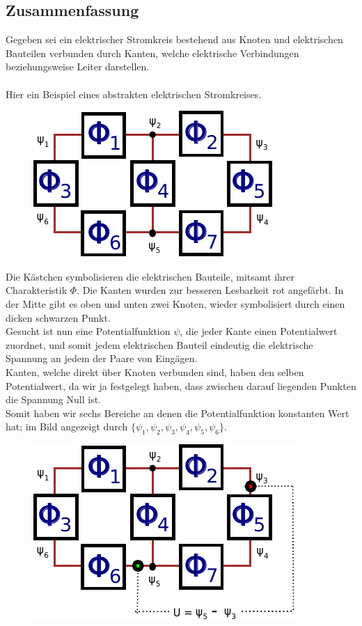 \documentclass[11pt,a4paper,leqno]{report}
\numberwithin{equation}{chapter}
\begin{document}
\subsection{Zusammenfassung}
Gegeben sei ein elektrischer Stromkreis bestehend aus Knoten und elektrischen Bauteilen verbunden durch Kanten, welche elektrische Verbindungen beziehungsweise Leiter darstellen.
\\
\\
Hier ein Beispiel eines abstrakten elektrischen Stromkreises. 
\begin{figure}[H]
	\begin{center}
		\includegraphics[scale=1]{_abstract.pdf}
	\end{center}
\end{figure}
\noindent
Die K\"astchen symbolisieren die elektrischen Bauteile, mitsamt ihrer Charakteristik $\Phi$. Die Kanten wurden zur besseren Lesbarkeit rot angef\"arbt. In der Mitte gibt es oben und unten zwei Knoten, wieder symbolisiert durch einen dicken schwarzen Punkt.\\
Gesucht ist nun eine Potentialfunktion $\psi$, die jeder Kante einen Potentialwert zuordnet, und somit jedem elektrischen Bauteil eindeutig die elektrische Spannung an jedem der Paare von Eing\"agen.\\
Kanten, welche direkt \"uber Knoten verbunden sind, haben den selben Potentialwert, da wir ja festgelegt haben, dass zwischen darauf liegenden Punkten die Spannung Null ist.\\
Somit haben wir sechs Bereiche an denen die Potentialfunktion konstanten Wert hat; im Bild angezeigt durch $\{\psi_1, \psi_2, \psi_3, \psi_4, \psi_5, \psi_6\}$. 
\begin{figure}[H]
	\begin{center}
		\includegraphics[scale=1]{potent.pdf}
	\end{center}
\end{figure}
\end{document}
